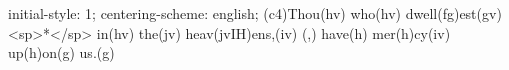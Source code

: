 initial-style: 1;
centering-scheme: english;
(c4)Thou(hv) who(hv) dwell(fg)est(gv) <sp>*</sp> in(hv) the(jv) heav(jvIH)ens,(iv) (,) have(h) mer(h)cy(iv) up(h)on(g) us.(g)
